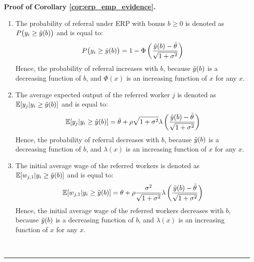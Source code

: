 \documentclass[12pt]{article}
\newenvironment{proof}[1][Proof of]{\noindent\textbf{#1} }{\ \rule{0.5em}{0.5em}}
\begin{document}
\begin{proof}
    \textbf{Corollary \ref{cor:erp_emp_evidence}.}
    \begin{enumerate}[label={\roman*})]
        \item The probability of referral under ERP with bonus $b\geq 0$ is denoted as $P\bigl(y_i \geq \Tilde{y}(b)\bigr)$ and is equal to:
        \begin{equation*}
            P\bigl(y_i \geq \Tilde{y}(b)\bigr) = 1-\Phi\left( \frac{\Tilde{y}(b) - \bar{\theta}}{\sqrt{1+\sigma^2}} \right)
        \end{equation*}
        Hence, the probability of referral increases with $b$, because $\Tilde{y}(b)$ is a decreasing function of $b$, and $\Phi(x)$ is an increasing function of $x$ for any $x$.
        \item The average expected output of the referred worker $j$ is denoted as $\mathbb{E}[y_j | y_i \geq \Tilde{y}(b)]$ and is equal to:
        \begin{equation*}
            \mathbb{E}[y_j | y_i \geq \Tilde{y}(b)] = \bar{\theta} + \rho \sqrt{1+\sigma^2}\lambda\left( \frac{\Tilde{y}(b) - \bar\theta}{\sqrt{1+\sigma^2}} \right) 
        \end{equation*}
        Hence, the probability of referral decreases with $b$, because $\Tilde{y}(b)$ is a decreasing function of $b$, and $\lambda(x)$ is an increasing function of $x$ for any $x$.
        \item The initial average wage of the referred workers is denoted as $\mathbb{E}[w_{j,1} | y_i \geq \Tilde{y}(b)]$ and is equal to:
        \begin{equation*}
            \mathbb{E}[w_{j,1} | y_i \geq \Tilde{y}(b)] = \theta + \rho\frac{\sigma^2}{\sqrt{1+\sigma^2}}\lambda\left( \frac{\Tilde{y}(b) - \bar\theta}{\sqrt{1+\sigma^2}} \right) 
        \end{equation*}
        Hence, the initial average wage of the referred workers decreases with $b$, because $\Tilde{y}(b)$ is a decreasing function of $b$, and $\lambda(x)$ is an increasing function of $x$ for any $x$.
    \end{enumerate}
\end{proof}
\pagebreak
\end{document}
